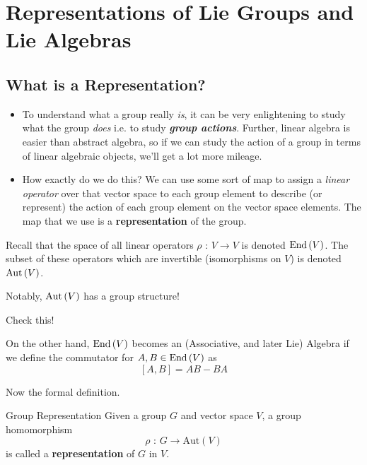 \documentclass[11pt]{article}
\begin{document}
\newpage
\section{Representations of Lie Groups and Lie Algebras}
\subsection{What is a Representation?}
\begin{itemize}
    \item To understand what a group really \emph{is}, it can be very enlightening to study what the group \emph{does} i.e. to study \emph{\textbf{group actions}}. Further, linear algebra is easier than abstract algebra, so if we can study the action of a group in terms of linear algebraic objects, we'll get a lot more mileage.
    \item How exactly do we do this? We can use some sort of map to assign a \emph{linear operator} over that vector space to each group element to describe (or represent) the action of each group element on the vector space elements. The map that we use is a \textbf{representation} of the group.
\end{itemize}

\vskip 0.5cm
\begin{redbox}
  Recall that the space of all linear operators $\rho \text{ : } V \rightarrow V$ is denoted $\mathrm{End}\left(V\right)$. The subset of these operators which are invertible (isomorphisms on $V$) is denoted $\mathrm{Aut}\left(V\right)$. 
  
  \vskip 0.5cm
  Notably, $\mathrm{Aut}\left(V\right)$ has a group structure! \begin{thought}{Check this!} \end{thought} On the other hand, $\mathrm{End}\left(V\right)$ becomes an (Associative, and later Lie) Algebra if we define the commutator for $A, B \in \mathrm{End}\left(V\right)$ as
  \[ [A, B] = AB - BA \] 
  
\end{redbox}

\vskip 0.5cm
Now the formal definition.

\vskip 0.5cm
\begin{definition}{Group Representation}
  Given a group $G$ and vector space $V$, a group homomorphism \[ \rho \text{ : } G \rightarrow \mathrm{Aut}(V) \] is called a \textbf{representation} of $G$ in $V$.
\end{definition}
\end{document}
